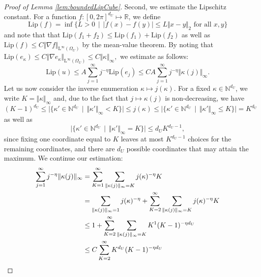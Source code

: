 \documentclass[10pt,a4paper]{amsart}
\newcommand{\Lip}{\mathrm{Lip}}
\def\Lp#1{\mathrm{L}^{#1}}
\newcommand{\bbN}{\mathbb{N}}
\newcommand{\bbR}{\mathbb{R}}
\begin{document}
\begin{proof}[Proof of Lemma \ref{lem:boundedLipCube}]
Second, we estimate the Lipschitz constant. For a function $f:[0,2\pi]^{d_U} \mapsto \bbR$, we define \[
\textrm{Lip}(f) = \inf \{L > 0 \,\mid \, \vert f(x) - f(y) \vert \leq L \Vert x - y \Vert_2 \text{ for all $x,y$}\}
\]
and note that that $\textrm{Lip}(f_1 + f_2)\leq \textrm{Lip}(f_1) + \textrm{Lip}(f_2)$ as well as $\textrm{Lip}(f) \leq C \Vert \nabla f \Vert_{\Lp{\infty}(\Omega_U)}$ by the mean-value theorem.
By noting that 
\(
\Lip(e_\kappa) \leq C \Vert \nabla e_\kappa \Vert_{\Lp{\infty}(\Omega_U)} \leq C \Vert \kappa \Vert_{\infty},
\)
we estimate as follows:
\begin{equation} \label{eq:hypercudeBoundedLipschitz:eq1}
\Lip(u)
\le
A \sum_{j=1}^\infty j^{-\eta}\Lip(e_j)
\leq C
A \sum_{j=1}^\infty j^{-\eta} \Vert \kappa(j) \Vert_{\infty}.  
\end{equation}
Let us now consider the inverse enumeration $\kappa \mapsto j(\kappa)$. For a fixed $\kappa \in \bbN^{d_U}$, we write $K = \Vert \kappa \Vert_\infty$ and, due to the fact that $j \mapsto \kappa(j)$ is non-decreasing, we have 
\begin{equation} \label{eq:hypercudeBoundedLipschitz:eq2}
  (K-1)^{d_U} \leq \vert \{\kappa' \in \bbN^{d_U} \, \mid \, \Vert \kappa' \Vert_\infty < K \} \vert \leq j(\kappa) \leq \vert \{\kappa' \in \bbN^{d_U} \, \mid \, \Vert \kappa' \Vert_\infty \leq K \} \vert = K^{d_U}
\end{equation}
as well as \begin{equation} \label{eq:hypercudeBoundedLipschitz:eq5}
    \vert \{\kappa' \in \bbN^{d_U} \, \mid \, \Vert \kappa' \Vert_\infty = K \} \vert \leq d_U K^{d_U -1},
\end{equation}
since fixing one coordinate equal to $K$ leaves at most $K^{d_U-1}$ choices for the remaining coordinates, and there are $d_U$ possible coordinates that may attain the maximum.
We continue our estimation: \begin{align}
\sum_{j=1}^\infty j^{-\eta} \Vert \kappa(j) \Vert_{\infty} &=  \sum_{K=1}^\infty \sum_{\Vert \kappa(j) \Vert_\infty = K} j(\kappa)^{-\eta} K \notag \\
&= \sum_{\Vert \kappa(j) \Vert_\infty = 1} j(\kappa)^{-\eta} + \sum_{K=2}^\infty \sum_{\Vert \kappa(j) \Vert_\infty = K} j(\kappa)^{-\eta} K \notag \\
&\leq1 + \sum_{K=2}^\infty \sum_{\Vert \kappa(j) \Vert_\infty = K} K^{1}(K-1)^{-\eta d_U} \label{eq:hypercudeBoundedLipschitz:eq3}\\
&\leq C \sum_{K=2}^\infty K^{d_U} (K-1)^{-\eta d_U}\label{eq:hypercudeBoundedLipschitz:eq4} \\

\end{align}
\end{proof}
\end{document}
